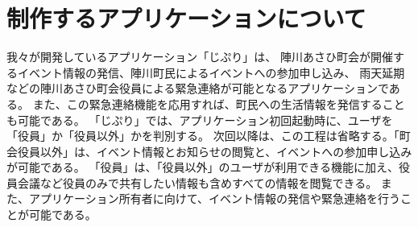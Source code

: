 \section{制作するアプリケーションについて}
我々が開発しているアプリケーション「じぷり」は、
陣川あさひ町会が開催するイベント情報の発信、陣川町民によるイベントへの参加申し込み、
雨天延期などの陣川あさひ町会役員による緊急連絡が可能となるアプリケーションである。
また、この緊急連絡機能を応用すれば、町民への生活情報を発信することも可能である。
「じぷり」では、アプリケーション初回起動時に、ユーザを「役員」か「役員以外」かを判別する。
次回以降は、この工程は省略する。「町会役員以外」は、イベント情報とお知らせの閲覧と、イベントへの参加申し込みが可能である。
「役員」は、「役員以外」のユーザが利用できる機能に加え、役員会議など役員のみで共有したい情報も含めすべての情報を閲覧できる。
また、アプリケーション所有者に向けて、イベント情報の発信や緊急連絡を行うことが可能である。
